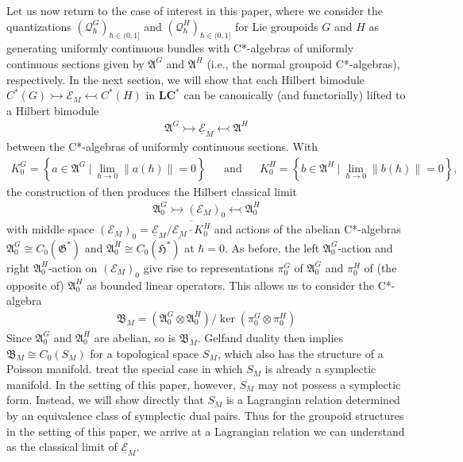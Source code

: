\documentclass[sn-mathphys,Numbered]{sn-jnl}
\providecommand{\norm}[1]{\lVert#1\rVert}
\begin{document}
Let us now return to the case of interest in this paper, where we consider the quantizations $(\mathcal{Q}_\hbar^G)_{\hbar\in (0,1]}$ and $(\mathcal{Q}_\hbar^H)_{\hbar\in (0,1]}$ for Lie groupoids $G$ and $H$ as generating uniformly continuous bundles with C*-algebras of uniformly continuous sections given by $\mathfrak{A}^G$ and $\mathfrak{A}^H$ (i.e., the normal groupoid C*-algebras), respectively.  In the next section, we will show that each Hilbert bimodule $C^*(G)\rightarrowtail\mathcal{E}_M\leftarrowtail C^*(H)$ in $\mathbf{LC^*}$ can be canonically (and functorially) lifted to a Hilbert bimodule \begin{align}    
\mathfrak{A}^G\rightarrowtail\underline{\mathcal{E}}_M\leftarrowtail \mathfrak{A}^H
\end{align}
between the C*-algebras of uniformly continuous sections.  With 
\begin{align}
    K^G_0 = \left\{a\in\mathfrak{A}^G\ |\ \lim_{\hbar\to 0}\norm{a(\hbar)} = 0 \right\} && \text{and} && K^H_0 = \left\{b\in\mathfrak{A}^H\ |\ \lim_{\hbar\to 0}\norm{b(\hbar)} = 0 \right\},
\end{align} the construction of \citet{FeSt24} then produces the Hilbert classical limit
\begin{align}
\mathfrak{A}^G_0\rightarrowtail(\mathcal{E}_M)_0\leftarrowtail\mathfrak{A}^H_0
\end{align}
with middle space $(\mathcal{E}_M)_0 = \underline{\mathcal{E}}_M/\overline{\underline{\mathcal{E}_M}\cdot K^H_0}$ and actions of the abelian C*-algebras $\mathfrak{A}^G_0\cong C_0(\mathfrak{G}^*)$ and $\mathfrak{A}^H_0\cong C_0(\mathfrak{H}^*)$ at $\hbar=0$.  As before, the left $\mathfrak{A}^G_0$-action and right $\mathfrak{A}^H_0$-action on $(\mathcal{E}_M)_0$ give rise to representations $\pi^G_0$ of $\mathfrak{A}^G_0$ and $\pi^H_0$ of (the opposite of) $\mathfrak{A}^H_0$ as bounded linear operators.  This allows us to consider the C*-algebra 
\begin{align}
\label{eq:symplectic_classical_limit}\mathfrak{B}_M =(\mathfrak{A}^G_0\otimes\mathfrak{A}^H_0)/\ker(\pi^G_0\otimes\pi^H_0)
\end{align}
Since $\mathfrak{A}^G_0$ and $\mathfrak{A}^H_0$ are abelian, so is $\mathfrak{B}_M$.  Gelfand duality then implies $\mathfrak{B}_M\cong C_0(S_M)$ for a topological space $S_M$, which also has the structure of a Poisson manifold.  \citet{FeSt24} treat the special case in which $S_M$ is already a symplectic manifold. 
 In the setting of this paper, however, $S_M$ may not possess a symplectic form. Instead, we will show directly that $S_M$ is a Lagrangian relation determined by an equivalence class of symplectic dual pairs.  Thus for the groupoid structures in the setting of this paper, we arrive at a Lagrangian relation we can understand as the classical limit of $\underline{\mathcal{E}}_M$.
\end{document}
